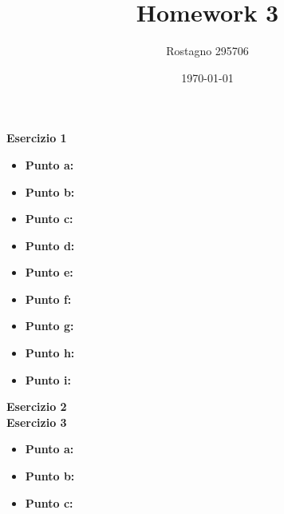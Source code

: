 \documentclass[a4paper,12pt]{article}
\begin{document}
	\title{\textbf{Homework 3}}
	\author{Rostagno 295706}
	\date{\today}
	\maketitle
	
	\centering \textbf{Esercizio 1}\\
	\begin{itemize}
		\item \textbf{Punto a: }
		\item \textbf{Punto b: }
		\item \textbf{Punto c: }
		\item \textbf{Punto d: }
		\item \textbf{Punto e: }
		\item \textbf{Punto f: }
		\item \textbf{Punto g: }
		\item \textbf{Punto h: }
		\item \textbf{Punto i: }
	\end{itemize}
	\centering \textbf{Esercizio 2}\\
	\centering \textbf{Esercizio 3}\\
	\begin{itemize}
		\item \textbf{Punto a: }
		\item \textbf{Punto b: }
		\item \textbf{Punto c: }
	\end{itemize}
	
\end{document}
